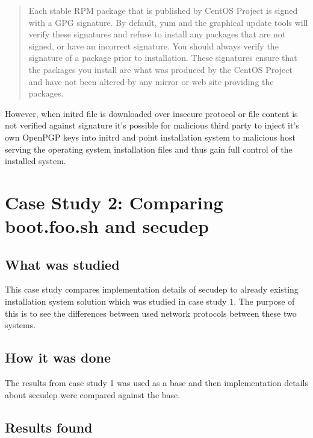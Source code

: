 \begin{quote}
Each stable RPM package that is published by CentOS Project is signed
with a GPG signature. By default, yum and the graphical update tools
will verify these signatures and refuse to install any packages that
are not signed, or have an incorrect signature. You should always
verify the signature of a package prior to installation. These
signatures ensure that the packages you install are what was produced
by the CentOS Project and have not been altered by any mirror or
web site providing the packages.
\end{quote}

However, when initrd file is downloaded over insecure protocol or file
content is not verified against signature it's possible for malicious
third party to inject it's own OpenPGP keys into initrd and point
installation system to malicious host serving the operating system
installation files and thus gain full control of the installed system.


\section{Case Study 2: Comparing boot.foo.sh and secudep}
\label{sec:casestudy2}

\subsection{What was studied}

This case study compares implementation details of secudep to already
existing installation system solution which was studied in
case study 1. The purpose of this is to see the differences between
used network protocols between these two systems.

\subsection{How it was done}

The results from case study 1 was used as a base and then
implementation details about secudep were compared against the base.

\subsection{Results found}

